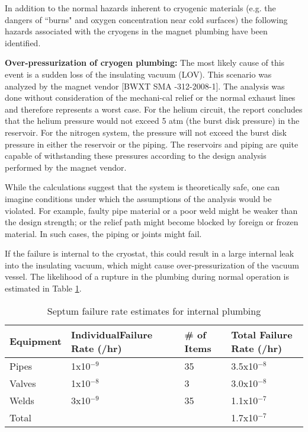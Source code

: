 In addition to the normal hazards inherent to cryogenic materials (e.g. the dangers of ``burns" and 
oxygen concentration near cold surfaces) the following hazards associated with the cryogens in the 
magnet plumbing have been identified.

{\bf Over-pressurization of cryogen plumbing:}  The most likely cause of this event is a sudden 
loss of the insulating vacuum (LOV).  This scenario was analyzed by the magnet vendor [BWXT SMA -312-2008-1].  
The analysis was done without consideration of the mechani-cal relief or the normal exhaust lines and 
therefore represents a worst case.  For the helium circuit, the report concludes that the helium pressure 
would not exceed 5 atm (the burst disk pressure) in the reservoir.  For the nitrogen system, the pressure 
will not exceed the burst disk pressure in either the reservoir or the piping.  The reservoirs and piping 
are quite capable of withstanding these pressures according to the design analysis performed by the magnet vendor.

While the calculations suggest that the system is theoretically safe, one can imagine conditions under 
which the assumptions of the analysis would be violated.  For example, faulty pipe material or a poor 
weld might be weaker than the design strength; or the relief path might become blocked by foreign or 
frozen material.  In such cases, the piping or joints might fail.

If the failure is internal to the cryostat, this could result in a large internal leak into the insulating 
vacuum, which might cause over-pressurization of the vacuum vessel.  The likelihood of a rupture in the 
plumbing during normal operation is estimated in Table \ref{tab:septumfail}.

\begin{table}[htp]
\begin{tabular}{|l|l|l|l|}
\hline
Equipment   & IndividualFailure Rate (/hr) & \# of Items & Total Failure Rate (/hr) \\ \hline
Pipes       & 1x10$^{-9}$                  & 35          & 3.5x10$^{-8}$\\
Valves      & 1x10$^{-8}$                  & 3           & 3.0x10$^{-8}$\\
Welds       & 3x10$^{-9}$                  & 35          & 1.1x10$^{-7}$\\ \hline
Total       &                              &             & 1.7x10$^{-7}$ \\ \hline
\end{tabular}
\caption[Septum: failures]{Septum failure rate estimates for internal plumbing }
\label{tab:septumfail}
\end{table}
	



